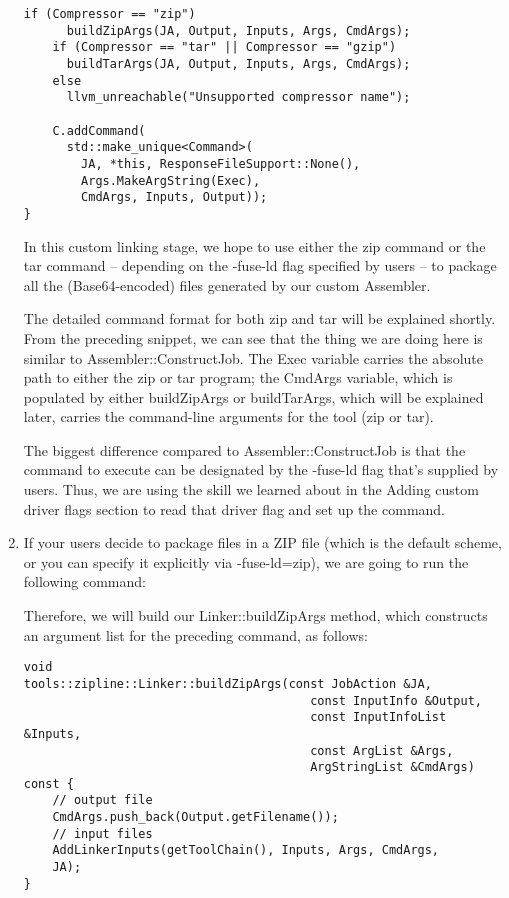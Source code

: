 \begin{enumerate}
\begin{lstlisting}[style=styleCXX]
	if (Compressor == "zip")
  	  buildZipArgs(JA, Output, Inputs, Args, CmdArgs);
	if (Compressor == "tar" || Compressor == "gzip")
	  buildTarArgs(JA, Output, Inputs, Args, CmdArgs);
	else
	  llvm_unreachable("Unsupported compressor name");
	
	C.addCommand(
	  std::make_unique<Command>(
	    JA, *this, ResponseFileSupport::None(),
	    Args.MakeArgString(Exec),
	    CmdArgs, Inputs, Output));
}
\end{lstlisting}

In this custom linking stage, we hope to use either the zip command or the tar command – depending on the -fuse-ld flag specified by users – to package all the (Base64-encoded) files generated by our custom Assembler.

The detailed command format for both zip and tar will be explained shortly. From the preceding snippet, we can see that the thing we are doing here is similar to Assembler::ConstructJob. The Exec variable carries the absolute path to either the zip or tar program; the CmdArgs variable, which is populated by either buildZipArgs or buildTarArgs, which will be explained later, carries the command-line arguments for the tool (zip or tar).

The biggest difference compared to Assembler::ConstructJob is that the command to execute can be designated by the -fuse-ld flag that's supplied by users. Thus, we are using the skill we learned about in the Adding custom driver flags section to read that driver flag and set up the command.

\item If your users decide to package files in a ZIP file (which is the default scheme, or you can specify it explicitly via -fuse-ld=zip), we are going to run the following command:


Therefore, we will build our Linker::buildZipArgs method, which constructs an argument list for the preceding command, as follows:

\begin{lstlisting}[style=styleCXX]
void
tools::zipline::Linker::buildZipArgs(const JobAction &JA,
										const InputInfo &Output,
										const InputInfoList &Inputs,
										const ArgList &Args,
										ArgStringList &CmdArgs) const {
	// output file
	CmdArgs.push_back(Output.getFilename());
	// input files
	AddLinkerInputs(getToolChain(), Inputs, Args, CmdArgs,
	JA);
}
\end{lstlisting}


\end{enumerate}
